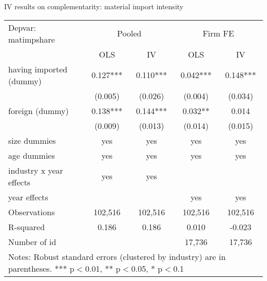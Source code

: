 \documentclass[10pt]{beamer}
\begin{document}
\begin{frame}{IV results on complementarity: material import intensity}
\begin{table}
	\renewcommand{\baselinestretch}{1.2}  \scriptsize \centering
	\begin{tabular}{lcccc}
		\hline \hline
    	Depvar: matimpshare & \multicolumn{2}{c}{Pooled} & \multicolumn{2}{c}{Firm FE} \\
		& OLS   & IV    & OLS   & IV \\ \hline
		having imported (dummy) & 0.127*** & 0.110*** & 0.042*** & 0.148*** \\
		& (0.005) & (0.026) & (0.004) & (0.034) \\
		foreign (dummy) & 0.138*** & 0.144*** & 0.032** & 0.014 \\
		& (0.009) & (0.013) & (0.014) & (0.015) \\
		size dummies & yes   & yes   & yes   & yes \\
		age dummies & yes   & yes   & yes   & yes \\
		industry x year effects & yes   & yes   &       &  \\
		year effects &       &       & yes   & yes \\
		Observations & 102,516 & 102,516 & 102,516 & 102,516 \\
		R-squared & 0.186 & 0.186 & 0.010 & -0.023 \\
		Number of id &       &       & 17,736 & 17,736 \\
		\hline \hline
		\multicolumn{5}{l}{%
			\begin{minipage}{8cm}
				\scriptsize Notes: Robust standard errors (clustered by industry) are in parentheses. *** p$<$0.01, ** p$<$0.05, * p$<$0.1%
			\end{minipage}%
		}\\
	\end{tabular}%
	\renewcommand{\baselinestretch}{1.62}\normalsize \setlength{\baselineskip}{0.65\baselineskip}
\end{table}
\end{frame}
\end{document}
